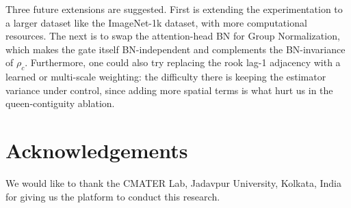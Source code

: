 \documentclass{bmvc2k}
\begin{document}
Three future extensions are suggested. First is extending the experimentation to a larger dataset like the ImageNet-1k dataset, with more computational resources. The next is to swap the attention-head BN for Group Normalization, which makes the gate itself BN-independent and complements the BN-invariance of $\rho_c$. Furthermore, one could also try replacing the rook lag-1 adjacency with a learned or multi-scale weighting: the difficulty there is keeping the estimator variance under control, since adding more spatial terms is what hurt us in the queen-contiguity ablation. 

\section{Acknowledgements}

We would like to thank the CMATER Lab, Jadavpur University, Kolkata, India for giving us the platform to conduct this research.







\end{document}
